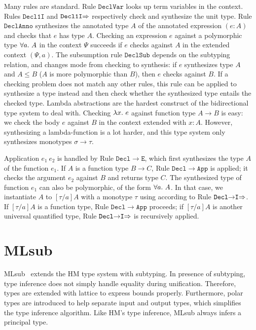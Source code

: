 Many rules are standard.
Rule $\mathtt{DeclVar}$ looks up term variables in the context.
Rules $\mathtt{Decl1I}$ and $\mathtt{Decl1I{\Rightarrow}}$ respectively check and synthesize the unit type.
Rule $\mathtt{DeclAnno}$ synthesizes the annotated type $A$ of the annotated expression $(e:A)$
and checks that $e$ has type $A$.
Checking an expression $e$ against a polymorphic type $\all A$ in the context $\Psi$ succeeds
if $e$ checks against $A$ in the extended context $(\Psi, a)$.
The subsumption rule $\mathtt{DeclSub}$ depends on the subtyping relation,
and changes mode from checking to synthesis: if $e$ synthesizes type $A$ and $A\le B$
($A$ is more polymorphic than $B$), then $e$ checks against $B$.
If a checking problem does not match any other rules,
this rule can be applied to synthesize a type instead and then
check whether the synthesized type entails the checked type.
Lambda abstractions are the hardest construct of the bidirectional
type system to deal with. 
Checking $\lam e$ against function type $A\to B$ is easy:
we check the body $e$ against $B$ in the context extended with $x:A$.
However, synthesizing a lambda-function is a lot harder, and 
this type system only synthesizes monotypes $\sigma\to\tau$.

Application $e_1~e_2$ is handled by Rule $\mathtt{Decl{\to}E}$,
which first synthesizes the type $A$ of the function $e_1$.
If $A$ is a function type $B\to C$, Rule $\mathtt{Decl{\to}App}$ is applied;
it checks the argument $e_2$ against $B$ and returns type $C$.
The synthesized type of function $e_1$ can also be polymorphic, of the form $\all A$.
In that case, we instantiate $A$ to $[\tau/a]A$ with a monotype $\tau$ %
using according to Rule $\mathtt{Decl{\to}I{\Rightarrow}}$.
If $[\tau/a]A$ is a function type, Rule $\mathtt{Decl{\to}App}$ proceeds;
if $[\tau/a]A$ is another universal quantified type,
Rule $\mathtt{Decl{\to}I{\Rightarrow}}$ is recursively applied.




\section{MLsub}\label{sec:mlsub}

MLsub~\citep{mlsub} extends the HM type system with subtyping.
In presence of subtyping, type inference does not simply handle equality during unification.
Therefore, types are extended with lattice to express bounds properly.
Furthermore, polar types are introduced to help separate input and output types,
which simplifies the type inference algorithm.
Like HM's type inference, MLsub always infers a principal type.

